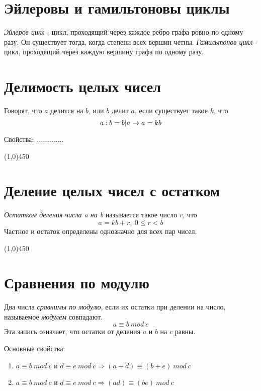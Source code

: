 \documentclass[a4paper,12pt]{article}
\newcommand{\divby}{\ \tikz \foreach \y in {0ex, 0.65ex, 1.3ex} \fill (0,\y) circle (0.5pt);\ }
\begin{document}
	\section*{Эйлеровы и гамильтоновы циклы}
	\textit{Эйлеров цикл} - цикл, проходящий через каждое ребро графа ровно по одному разу. Он существует тогда, когда степени всех вершин четны.
	\textit{Гамильтонов цикл} - цикл, проходящий через каждую вершину графа по одному разу.
	
	\section*{Делимость целых чисел}
	Говорят, что $a$ делится на $b$, или $b$ делит $a$, если существует такое $k$, что
	\[
	a \divby b = b | a \rightarrow a = kb
	\]
	
	Свойства: ..............
	
	\begin{center}
		\line(1,0){450}
	\end{center}
	
	\section*{Деление целых чисел с остатком}
	\textit{Остатком деления числа a на b} называется такое число $r$, что 
	\[
	a = kb + r, \ 0 \leq r < b
	\]
	Частное и остаток определены однозначно для всех пар чисел.
	
	\begin{center}
		\line(1,0){450}
	\end{center}

	\section*{Сравнения по модулю}
	Два числа \textit{сравнимы по модулю}, если их остатки при делении на число, называемое \textit{модулем} совпадают.
	\[
	a \equiv b \ mod \ c
	\]
	Эта запись означает, что остатки от деления $a$ и $b$ на $c$ равны.
	
	Основные свойства:
	\begin{enumerate}
		\item $a \equiv b \ mod \ c$ и $d \equiv e \ mod \ c \Rightarrow (a + d) \equiv (b + e) \ mod \ c$
		\item $a \equiv b \ mod \ c$ и $d \equiv e \ mod \ c \Rightarrow (ad) \equiv (be) \ mod \ c$
	
	\end{enumerate}
	
\end{document}
